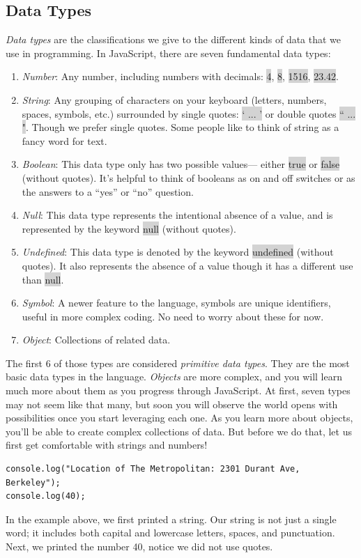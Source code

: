 \documentclass[11pt]{article}
\begin{document}
\subsection{Data Types}
\textit{Data types} are the classifications we give to the different kinds of data that we use in programming. In JavaScript, there are seven fundamental data types:
\begin{enumerate}[leftmargin = *]
\item \textit{Number}: Any number, including numbers with decimals: \colorbox{lightgray}{4}, \colorbox{lightgray}{8}, \colorbox{lightgray}{1516}, \colorbox{lightgray}{23.42}.
\item \textit{String}: Any grouping of characters on your keyboard (letters, numbers, spaces, symbols, etc.) surrounded by single quotes: \colorbox{lightgray}{` ... '} or double quotes \colorbox{lightgray}{`` ... "}. Though we prefer single quotes. Some people like to think of string as a fancy word for text. 
\item \textit{Boolean}: This data type only has two possible values— either \colorbox{lightgray}{true} or \colorbox{lightgray}{false} (without quotes). It’s helpful to think of booleans as on and off switches or as the answers to a “yes” or “no” question. 
\item \textit{Null}: This data type represents the intentional absence of a value, and is represented by the keyword \colorbox{lightgray}{null} (without quotes).
\item \textit{Undefined}: This data type is denoted by the keyword \colorbox{lightgray}{undefined} (without quotes). It also represents the absence of a value though it has a different use than \colorbox{lightgray}{null}.
\item \textit{Symbol}: A newer feature to the language, symbols are unique identifiers, useful in more complex coding. No need to worry about these for now.
\item \textit{Object}: Collections of related data.
\end{enumerate}
The first 6 of those types are considered \textit{primitive data types}. They are the most basic data types in the language. \textit{Objects} are more complex, and you will learn much more about them as you progress through JavaScript. At first, seven types may not seem like that many, but soon you will observe the world opens with possibilities once you start leveraging each one. As you learn more about objects, you’ll be able to create complex collections of data. But before we do that, let us first get comfortable with strings and numbers!
\begin{lstlisting}
console.log("Location of The Metropolitan: 2301 Durant Ave, Berkeley");
console.log(40);
\end{lstlisting}
In the example above, we first printed a string. Our string is not just a single word; it includes both capital and lowercase letters, spaces, and punctuation. Next, we printed the number 40, notice we did not use quotes.
\end{document}

